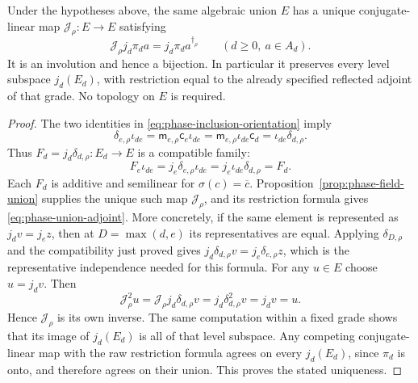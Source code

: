 \begin{proposition}
\label{prop:phase-union-adjoint}
Under the hypotheses above, the same algebraic union $E$ has a unique
conjugate-linear map $\mathcal J_\rho:E\to E$ satisfying
\begin{equation}\label{eq:phase-union-adjoint}
 \mathcal J_\rho j_d\pi_da=j_d\pi_d a^{\dagger_\rho}
 \qquad(d\ge0,\ a\in A_d).
\end{equation}
It is an involution and hence a bijection. In particular it preserves every
level subspace $j_d(E_d)$, with restriction equal to the already specified
reflected adjoint of that grade. No topology on $E$ is required.
\end{proposition}
\begin{proof}
The two identities in \eqref{eq:phase-inclusion-orientation} imply
\[
 \delta_{e,\rho}\iota_{de}
 =\mathsf m_{e,\rho}\mathsf c_e\iota_{de}
 =\mathsf m_{e,\rho}\iota_{de}\mathsf c_d
 =\iota_{de}\delta_{d,\rho}.
\]
Thus $F_d=j_d\delta_{d,\rho}:E_d\to E$ is a compatible family:
\[
 F_e\iota_{de}=j_e\delta_{e,\rho}\iota_{de}
              =j_e\iota_{de}\delta_{d,\rho}=F_d.
\]
Each $F_d$ is additive and semilinear for $\sigma(c)=\overline c$.
Proposition~\ref{prop:phase-field-union} supplies the unique such map
$\mathcal J_\rho$, and its restriction formula gives
\eqref{eq:phase-union-adjoint}. More concretely, if the same element is
represented as $j_dv=j_ez$, then at $D=\max(d,e)$ its representatives
are equal. Applying $\delta_{D,\rho}$ and the compatibility just proved
gives $j_d\delta_{d,\rho}v=j_e\delta_{e,\rho}z$, which is the
representative independence needed for this formula.
For any $u\in E$ choose $u=j_dv$. Then
\[
 \mathcal J_\rho^2u
 =\mathcal J_\rho j_d\delta_{d,\rho}v
 =j_d\delta_{d,\rho}^2v=j_dv=u.
\]
Hence $\mathcal J_\rho$ is its own inverse. The same computation within
a fixed grade shows that its image of $j_d(E_d)$ is all of that level
subspace. Any competing conjugate-linear map with the raw restriction
formula agrees on every $j_d(E_d)$, since $\pi_d$ is onto, and therefore
agrees on their union. This proves the stated uniqueness.
\end{proof}

